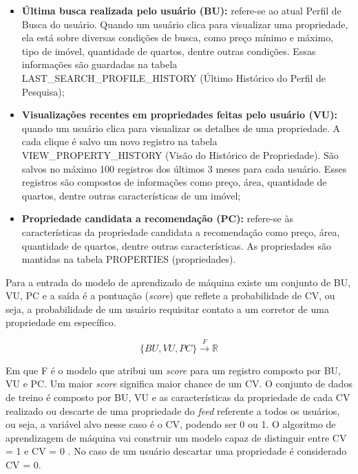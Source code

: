 \begin{itemize}
    \item \textbf{Última busca realizada pelo usuário (BU):} refere-se ao atual Perfil de Busca do usuário. Quando um usuário clica para visualizar uma propriedade, ela está sobre diversas condições de busca, como preço mínimo e máximo, tipo de imóvel, quantidade de quartos, dentre outras condições. Essas informações são guardadas na tabela LAST\_SEARCH\_PROFILE\_HISTORY (Último Histórico do Perfil de Pesquisa);

    \item \textbf{Visualizações recentes em propriedades feitas pelo usuário (VU):} quando um usuário clica para visualizar os detalhes de uma propriedade. A cada clique é salvo um novo registro na tabela VIEW\_PROPERTY\_HISTORY (Visão do Histórico de Propriedade). São salvos no máximo 100 registros dos últimos 3 meses para cada usuário. Esses registros são compostos de informações como preço, área, quantidade de quartos, dentre outras características de um imóvel;

    \item \textbf{Propriedade candidata a recomendação (PC):} refere-se às características da propriedade candidata a recomendação como preço, área, quantidade de quartos, dentre outras características. As propriedades são mantidas na tabela PROPERTIES (propriedades).
\end{itemize}

    Para a entrada do modelo de aprendizado de máquina existe um conjunto de {BU, VU, PC} e a saída é a pontuação (\textit{score}) que reflete a probabilidade de CV, ou seja, a probabilidade de um usuário requisitar contato a um corretor de uma propriedade em específico.

\begin{equation}
    \{BU,VU,PC\}  \xrightarrow{F} \mathbb{R}
\end{equation}

Em que F é o modelo que atribui um \textit{score} para um registro composto por BU, VU e PC. Um maior \textit{score} significa maior chance de um CV. O conjunto de dados de treino é composto por BU, VU e as características da propriedade de cada CV realizado ou descarte de uma propriedade do \textit{feed} referente a todos os usuários, ou seja, a variável alvo nesse caso é o CV, podendo ser 0 ou 1. O algoritmo de aprendizagem de máquina vai construir um modelo capaz de distinguir entre CV = 1 e CV = 0 . No caso de um usuário descartar uma propriedade é considerado CV = 0.

